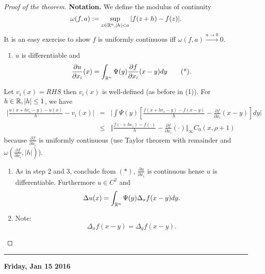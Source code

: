 \documentclass[11pt]{amsart}%
\begin{document}
\begin{proof}[Proof of the theorem]
\textbf{Notation.} We define the modulus of continuity
\[\omega(f,a):=\sup_{z\in\mathbb{R}^n, \vert h\vert <a} \vert f(z+h)-f(z)\vert.\]
It is an easy exercise to show \(f\) is uniformly continuous iff
\(\omega(f,a)\stackrel{a\to0}{\to}0\).

\begin{enumerate}
\def\labelenumi{\arabic{enumi}.}
\setcounter{enumi}{2}

\item
  \(u\) is differentiable and
  \[\frac{\partial u}{\partial x_i}(x)=\int_{\mathbb{R}^n} \Psi(y)\frac{\partial f}{\partial x_i}(x-y)dy \tag{*}.\]
\end{enumerate}

Let \(v_i(x)=RHS\) then \(v_i(x)\) is well-defined (as before in (1)).
For \(h\in \mathbb{R}, \vert h \vert \le 1\), we have
\begin{eqnarray*}
\vert \frac{u(x+he_i-y)-u(x)}{h}-v_i(x)\vert &=&\vert \int \Psi(y)[\frac{f(x+he_i-y)-f(x-y)}{h}-\frac{\partial f}{\partial x_i}(x-y)]dy\vert\\
&\le& \Vert \frac{f(\cdot +he_i)-f(\cdot)}{h} -\frac{\partial f}{\partial x_i}(\cdot)\Vert_\infty C_0(x,\rho+1)
\end{eqnarray*}
because \(\frac{\partial f}{\partial x_i}\) is uniformly continuous (use
Taylor theorem with remainder and
$\omega(\frac{\partial f}{\partial x_i},\vert h\vert)$).

\begin{enumerate}
\def\labelenumi{\arabic{enumi}.}
\setcounter{enumi}{3}
\item
  As in step 2 and 3, conclude from \((*)\),
  \(\frac{\partial u}{\partial x_i}\) is continuous hense \(u\) is
  differentiable. Furthermore \(u\in C^2\) and
  \[\Delta u(x) =\int_{\mathbb{R}^n} \Psi(y)\Delta_x f(x-y)dy.\]
\item
  Note: \[\Delta_x f(x-y)=\Delta_y f(x-y).\]
\end{enumerate}
\end{proof}

\begin{center}\rule{0.5\linewidth}{\linethickness}\end{center}

\textbf{Friday, Jan 15 2016}
\end{document}
